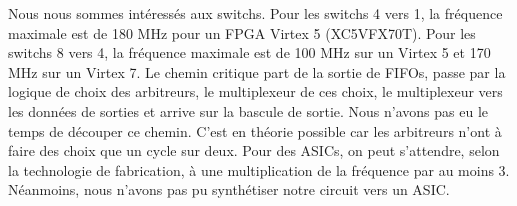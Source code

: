 Nous nous sommes intéressés aux switchs. Pour les switchs 4 vers 1, la fréquence
maximale est de 180 MHz pour un FPGA Virtex 5 (XC5VFX70T). Pour les switchs 8
vers 4, la fréquence maximale est de 100 MHz sur un Virtex 5 et 170 MHz sur un
Virtex 7. Le chemin critique part de la sortie de FIFOs, passe par la logique de
choix des arbitreurs, le multiplexeur de ces choix, le multiplexeur vers les
données de sorties et arrive sur la bascule de sortie. Nous n'avons pas eu le
temps de découper ce chemin. C'est en théorie possible car les arbitreurs n'ont
à faire des choix que un cycle sur deux. Pour des ASICs, on peut s'attendre,
selon la technologie de fabrication, à une multiplication de la fréquence par au
moins 3. Néanmoins, nous n'avons pas pu synthétiser notre circuit vers un ASIC.


